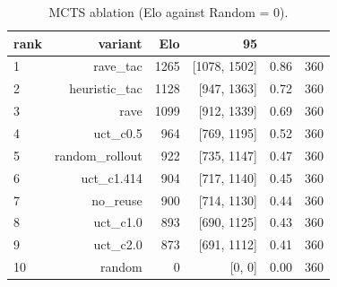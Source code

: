 \begin{table}[ht]
\centering
\begin{tabular}{lrrrrr}
\toprule
rank & variant & Elo & 95\\%
\midrule
1 & rave\_tac & 1265 & [1078, 1502] & 0.86 & 360 \\
2 & heuristic\_tac & 1128 & [947, 1363] & 0.72 & 360 \\
3 & rave & 1099 & [912, 1339] & 0.69 & 360 \\
4 & uct\_c0.5 & 964 & [769, 1195] & 0.52 & 360 \\
5 & random\_rollout & 922 & [735, 1147] & 0.47 & 360 \\
6 & uct\_c1.414 & 904 & [717, 1140] & 0.45 & 360 \\
7 & no\_reuse & 900 & [714, 1130] & 0.44 & 360 \\
8 & uct\_c1.0 & 893 & [690, 1125] & 0.43 & 360 \\
9 & uct\_c2.0 & 873 & [691, 1112] & 0.41 & 360 \\
10 & random & 0 & [0, 0] & 0.00 & 360 \\
\bottomrule
\end{tabular}
\caption{MCTS ablation (Elo against Random = 0).}
\label{tab:mcts-ablation}
\end{table}
